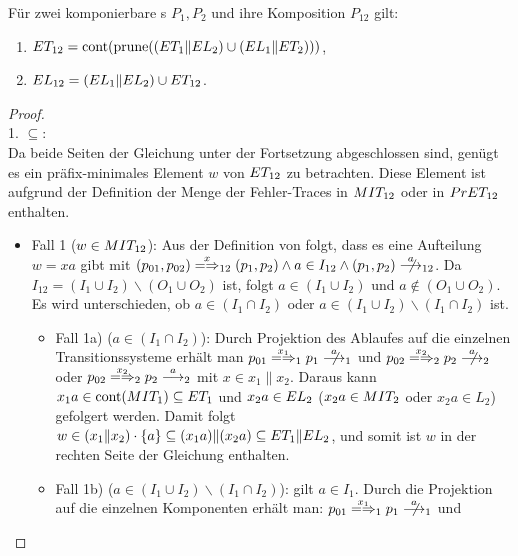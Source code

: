 \begin{Satz}
  \label{KommFehlerSemSatz}
  Für zwei komponierbare \MEIO{}s $P_1,P_2$ und ihre Komposition $P_{12}$ gilt:
  \begin{enumerate}
    \item $ET _{12} = \mathrm{cont} (\mathrm{prune} ((ET _1\|EL _2) \cup (EL _1\|ET
      _2)))$,
    \item $EL _{12} = (EL _1\|EL _2) \cup ET _{12}$.
  \end{enumerate}
\end{Satz}
\begin{proof}\mbox{}\\
  1. \glqq$\subseteq$\grqq{}:\\
  Da beide Seiten der Gleichung unter der Fortsetzung \cont{} abgeschlossen
  sind, genügt es ein präfix-minimales Element $w$ von $ET _{12}$ zu
  betrachten. Diese Element ist aufgrund der Definition der Menge der
  Fehler-Traces in $MIT _{12}$ oder in $PrET _{12}$ enthalten.
  \begin{itemize}
    \item Fall 1 ($w\in MIT _{12}$): Aus der Definition von \MIT{} folgt, dass
      es eine Aufteilung $w=xa$ gibt mit $(p_{01},p_{02}) \weakmay[x]_{12}
      (p_1,p_2) \land a \in I_{12} \land (p_1,p_2) \nmust[a]_{12}$. Da $I_{12}
      = (I_1\cup I_2) \backslash (O_1\cup O_2)$ ist, folgt $a\in (I_1\cup I_2)$
      und $a\notin (O_1\cup O_2)$. Es wird unterschieden, ob $a\in (I_1\cap
      I_2)$ oder $a\in (I_1\cup I_2) \backslash (I_1\cap I_2)$ ist.
    \begin{itemize}
      \item Fall 1a) ($a\in (I_1\cap I_2)$): Durch Projektion des Ablaufes auf
        die einzelnen Transitionssysteme erhält man \oBdA{}
        $p_{01}\weakmay[x_1]_1 p_1\nmust[a]_1$ und $p_{02}\weakmay[x_2]_2
        p_2\nmust[a]_2$ oder $p_{02}\weakmay[x_2]_2 p_2\must[a]_2$ mit $x\in
        x_1\|x_2$. Daraus kann $x_1a\in \mathrm{cont} (MIT _1) \subseteq ET _1$ und
        $x_2a\in EL _2$ ($x_2a\in MIT _2$ oder $x_2a \in L_2$) gefolgert
        werden. Damit folgt $w\in (x_1\|x_2) \cdot \{a\} \subseteq
        (x_1a)\|(x_2a)\subseteq ET _1\|EL _2$, und somit ist $w$ in der
        rechten Seite der Gleichung enthalten.
      \item Fall 1b) ($a\in (I_1\cup I_2)\backslash (I_1\cap I_2)$): \OBdA{}
        gilt $a\in I_1$. Durch die Projektion auf die einzelnen Komponenten
        erhält man: $p_{01}\weakmay[x_1]_1 p_1\nmust[a]_1$ und

\end{itemize}
\end{itemize}
\end{proof}

